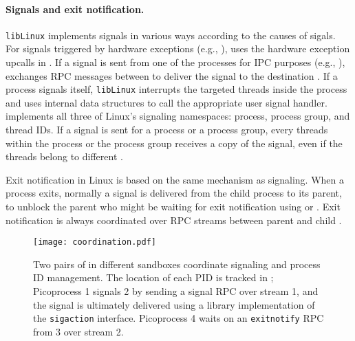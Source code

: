 \paragraph{Signals and exit notification.}
{\tt libLinux} implements signals
in various ways according to the causes of sigals.
For signals triggered by hardware exceptions (e.g., ),
\thelibos{} uses the hardware exception upcalls
in \thehostabi{}.
If a signal is sent from one of the processes for IPC purposes (e.g., ),
\thelibos{} exchanges RPC messages between \picoprocs{} to deliver the signal to the destination \picoproc{}.
If a process signals itself, {\tt libLinux} interrupts the targeted threads inside the process
and uses internal data structures
to call the appropriate user signal handler.
\thelibos{} implements all three of Linux's signaling namespaces:
process, process group, and thread IDs.
If a signal is sent for a process or a process group,
every threads within the process or the process group receives a copy of the signal,
even if the threads belong to different \picoprocs{}.


Exit notification in Linux is based on the same mechanism as signaling.
When a process exits, normally a  signal
is delivered from the child process to its parent,
to unblock the parent who might be waiting for exit notification using  or .
Exit notification is always coordinated over RPC streams
between parent and child \picoprocs{}.



\begin{figure}
\centering
\texttt{[image: coordination.pdf]}
\caption{Two pairs of \graphene{} \picoprocs{} in different sandboxes 
coordinate signaling and process ID management.
The location of each PID is tracked in \thelibos{}; Picoprocess 1 signals
\picoproc{} 2 by sending a signal RPC over stream 1,
and the signal is ultimately delivered using a 
library implementation of the {\tt sigaction} interface. Picoprocess 4 
waits on an {\tt exitnotify} RPC from  \picoproc{} 3 over stream 2. }
\label{fig:libos:coordination}
\end{figure}


